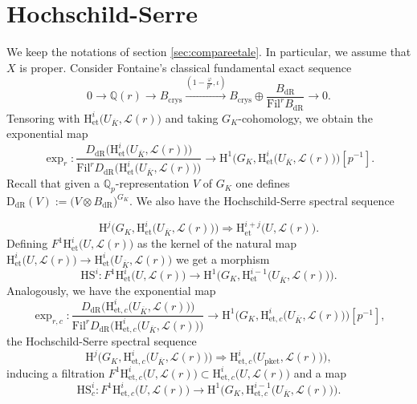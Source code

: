 \documentclass[asterisque,english]{smfart}
\begin{document}
\section{Hochschild-Serre}\label{sec:HS}

We keep the notations of section \ref{sec:compareetale}. In particular, we assume that $X$ is proper.  Consider Fontaine's classical fundamental exact sequence $$0 \to \mathbb{Q}(r) \longrightarrow  B_{\mathrm{crys}} \stackrel{(1-\frac{\varphi}{p^r},\iota)}{\longrightarrow} B_{\mathrm{crys}} \oplus \frac{B_{\mathrm{dR}}}{ \mathrm{Fil}^rB_{\mathrm{dR}}}  \to 0.$$Tensoring with $\mathrm{H}^i_{\mathrm{et}}\bigl(U_{\overline{K}},  \mathcal{L}(r)\bigr)$ and taking $G_K$-cohomology, we obtain the exponential map 
$$\exp_r\colon \frac{D_{\mathrm{dR}}\bigl(\mathrm{H}^i_{\mathrm{et}}\bigl(U_{\overline{K}},  \mathcal{L}(r)\bigr)\bigr)}{\mathrm{Fil}^r D_{\mathrm{dR}}\bigl(\mathrm{H}^i_{\mathrm{et}}\bigl(U_{\overline{K}},  \mathcal{L}(r)\bigr)\bigr)} \longrightarrow \mathrm{H}^1(G_K,\mathrm{H}^i_{\mathrm{et}}\bigl(U_{\overline{K}},  \mathcal{L}(r)\bigr)\bigr)[p^{-1}].$$Recall that given a $\mathbb{Q}_p$-representation $V$ of $G_K$ one defines  $ \mathrm{D}_{\mathrm{dR}}(V):=\bigl(V\otimes B_{\mathrm{dR}}\bigr)^{G_K}$. We also have the Hochschild-Serre spectral sequence 


$$\mathrm{H}^j\bigl(G_K,\mathrm{H}^i_{\mathrm{et}}\bigl(U_{\overline{K}},  \mathcal{L}(r)\bigr) \bigr) \Rightarrow 
 \mathrm{H}^{i+j}_{\mathrm{et}}\bigl(U,\mathcal{L}(r)\bigr).
$$Defining  $F^1\mathrm{H}^i_{\mathrm{et}}\bigl(U,  \mathcal{L}(r)\bigr)$ as the kernel of the natural map $\mathrm{H}^i_{\mathrm{et}}\bigl(U,  \mathcal{L}(r)\bigr)\to \mathrm{H}^i_{\mathrm{et}}\bigl(U_{\overline{K}},  \mathcal{L}(r)\bigr)$ we get a morphism $$\mathrm{HS }^i\colon F^1 \mathrm{H}^{i}_{\mathrm{et}}\bigl(U,  \mathcal{L}(r)\bigr)\to \mathrm{H}^1(G_K, \mathrm{H}^{i-1}_{\mathrm{et}}\bigl(U_{\overline{K}},  \mathcal{L}(r)\bigr)\bigr).$$Analogously, we have the exponential map
$$\exp_{r,c}\colon \frac{D_{\mathrm{dR}}\bigl(\mathrm{H}^i_{\mathrm{et},c}\bigl(U_{\overline{K}}, \mathcal{L}(r)\bigr)\bigr)}{\mathrm{Fil}^r  D_{\mathrm{dR}}\bigl(\mathrm{H}^i_{\mathrm{et},c}\bigl(U_{\overline{K}},  \mathcal{L}(r)\bigr)\bigr) }
 \longrightarrow \mathrm{H}^1(G_K,\mathrm{H}^i_{\mathrm{et},c}\bigl(U_{\overline{K}}, \mathcal{L}(r)\bigr)\bigr)[p^{-1}],$$the Hochschild-Serre spectral sequence
$$\mathrm{H}^j\bigl(G_K,\mathrm{H}^i_{\mathrm{et},c}\bigl(U_{\overline{K}},  \mathcal{L}(r)\bigr) \bigr) \Rightarrow 
\mathrm{H}^i_{\mathrm{et},c}\bigl(U_{\mathrm{pket}}, \mathcal{L}(r)\bigr)\bigr),
$$inducing a filtration   $F^1 \mathrm{H}^{i}_{\mathrm{et},c}\bigl(U, \mathcal{L}(r)\bigr)\subset \mathrm{H}^{i}_{\mathrm{et},c}\bigl(U, \mathcal{L}(r)\bigr)$ and a map $$\mathrm{HS }^i_c\colon F^1\mathrm{H}^{i}_{\mathrm{et},c}\bigl(U, \mathcal{L}(r)\bigr)\to \mathrm{H}^1(G_K, \mathrm{H}^{i-1}_{\mathrm{et},c}\bigl(U_{\overline{K}},  \mathcal{L}(r)\bigr)\bigr).$$
\end{document}
